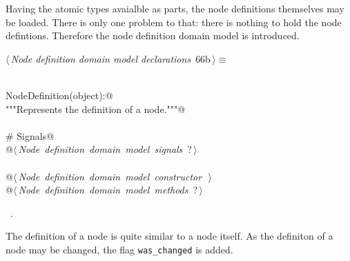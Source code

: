 \documentclass[
    a4paper,      %
    10pt,         %
    openright,    %
    notitlepage,  %
    parskip=half, %
]{scrreprt}       %
\theoremstyle{definition}                    %
\begin{document}
\begin{flushleft}
\begin{minipage}{\linewidth}
\begin{list}{}{\setlength{\itemsep}{-\parsep}\setlength{\itemindent}{-\leftmargin}}
\item{}
\end{list}
\end{minipage}\vspace{4ex}
\end{flushleft}
Having the atomic types avaialble as parts, the node definitions themselves may
be loaded. There is only one problem to that: there is nothing to hold the
node defintions. Therefore the node definition domain model is introduced.

\begin{flushleft} \small
\begin{minipage}{\linewidth}\label{scrap111}\raggedright\small
{} $\langle\,${\itshape Node definition domain model declarations}\nobreak\ {\footnotesize {66b}}$\,\rangle\equiv$
\vspace{-1exm}
\begin{list}{}{} \item
\mbox{}\lstinline@@\\
\mbox{}\lstinline@class NodeDefinition(object):@\\
\mbox{}\lstinline@    """Represents the definition of a node."""@\\
\mbox{}\lstinline@@\\
\mbox{}\lstinline@    # Signals@\\
\mbox{}\lstinline@    @\hbox{$\langle\,${\itshape Node definition domain model signals}\nobreak\ {\footnotesize ?}$\,\rangle$}\lstinline@@\\
\mbox{}\lstinline@@\\
\mbox{}\lstinline@    @\hbox{$\langle\,${\itshape Node definition domain model constructor}\nobreak\ {\footnotesize {}}$\,\rangle$}\lstinline@@\\
\mbox{}\lstinline@    @\hbox{$\langle\,${\itshape Node definition domain model methods}\nobreak\ {\footnotesize ?}$\,\rangle$}\lstinline@@{\NWsep}
\end{list}
\vspace{-1.5ex}
\footnotesize
\begin{list}{}{\setlength{\itemsep}{-\parsep}\setlength{\itemindent}{-\leftmargin}}
\item \NWtxtMacroRefIn\ .

\item{}
\end{list}
\end{minipage}\vspace{4ex}
\end{flushleft}
The definition of a node is quite similar to a node itself. As the definiton of
a node may be changed, the flag \verb+was_changed+ is added.
\end{document}
